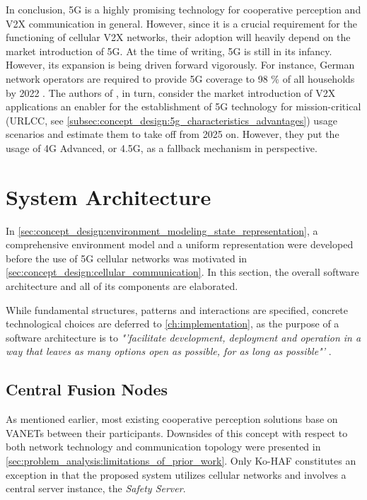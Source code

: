 In conclusion, 5G is a highly promising technology for cooperative perception and V2X communication in general. However, since it is a crucial requirement for the functioning of cellular V2X networks, their adoption will heavily depend on the market introduction of 5G. At the time of writing, 5G is still in its infancy. However, its expansion is being driven forward vigorously. For instance, German network operators are required to provide 5G coverage to 98 \% of all households by 2022 \cite{DeutscheWelle2019}. The authors of \cite{CCSInsight2018}, in turn, consider the market introduction of V2X applications an enabler for the establishment of 5G technology for mission-critical (URLCC, see \cref{subsec:concept_design:5g_characteristics_advantages}) usage scenarios and estimate them to take off from 2025 on. However, they put the usage of 4G Advanced, or 4.5G, as a fallback mechanism in perspective.

\section{System Architecture}
\label{sec:concept_design:system_architecture}
In \cref{sec:concept_design:environment_modeling_state_representation}, a comprehensive environment model and a uniform representation were developed before the use of 5G cellular networks was motivated in \cref{sec:concept_design:cellular_communication}. In this section, the overall software architecture and all of its components are elaborated.

While fundamental structures, patterns and interactions are specified, concrete technological choices are deferred to \cref{ch:implementation}, as the purpose of a software architecture is to \textit{"'facilitate development, deployment and operation in a way that leaves as many options open as possible, for as long as possible"'} \cite{Martin2017}.

\subsection{Central Fusion Nodes}
\label{subsec:concept_design:central_fusion_nodes}
As mentioned earlier, most existing cooperative perception solutions base on VANETs between their participants. Downsides of this concept with respect to both network technology and communication topology were presented in \cref{sec:problem_analysis:limitations_of_prior_work}. Only Ko-HAF \cite{Hohm2019} constitutes an exception in that the proposed system utilizes cellular networks and involves a central server instance, the \textit{Safety Server}.

